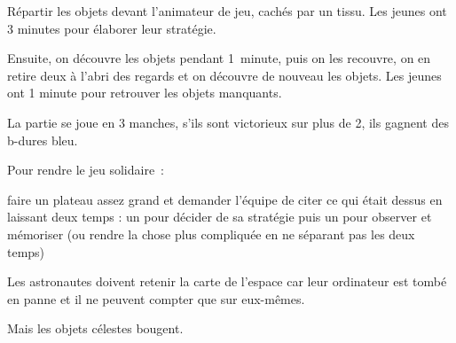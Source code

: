 \documentclass{grand-jeu}
\begin{document}
\begin{liste-materiel}
\end{liste-materiel}

\begin{regles}
Répartir les objets devant l’animateur de jeu, cachés par un tissu. Les jeunes ont 3 minutes pour élaborer leur stratégie.

Ensuite, on découvre les objets pendant 1 minute, puis on les recouvre, on en retire deux à l’abri des regards et on découvre de nouveau les objets. Les jeunes ont 1 minute pour retrouver les objets manquants.

La partie se joue en 3 manches, s’ils sont victorieux sur plus de 2, ils gagnent des b-dures bleu.

\vspace{0.2cm}

Pour rendre le jeu solidaire :

faire un plateau assez grand et demander l’équipe de citer ce qui était dessus en laissant deux temps : un pour décider de sa stratégie puis un pour observer et mémoriser (ou rendre la chose plus compliquée en ne séparant pas les deux temps) 


\end{regles}

\begin{imaginaire}
Les astronautes doivent retenir la carte de l’espace car leur ordinateur est tombé en panne et il ne peuvent compter que sur eux-mêmes.

Mais les objets célestes bougent.
\end{imaginaire}

\begin{moments-stop}
\end{moments-stop}
\end{document}
